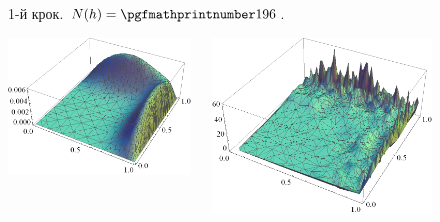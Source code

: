 \begin{frame}[allowframebreaks]
\begin{figure}[H]
\begin{columns}
\begin{column}{0.5\textwidth}
		     	\end{column}
		     \end{columns}
		     \caption*{1-й крок. $N(h) = \nn{196}$.}
		\end{figure}
		\begin{figure}[H]
			\begin{columns}
			 	\begin{column}{0.5\textwidth}
			 		\includegraphics[width=\textwidth]{problem2/my/solutions/solution3}
			 	 \end{column}
			     \begin{column}{0.5\textwidth}
					\includegraphics[width=\textwidth]{problem2/my/AEE/aee3}

\end{column}
\end{columns}
\end{figure}
\end{frame}
